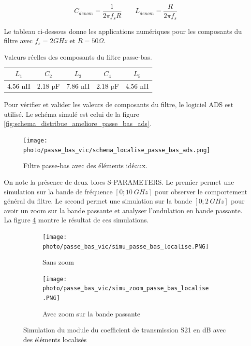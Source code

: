 \documentclass[french]{article}
\begin{document}
\begin{equation}
	C_{denom} = \frac{1}{2\pi f_s R}
	\qquad
	L_{denom} = \frac{R}{2\pi f_s}
\end{equation}

Le tableau ci-dessous donne les applications numériques pour les composants du filtre avec $f_s = 2GHz$ et $R = 50\Omega$.

\begin{table}[H]
	\centering
	\begin{tabular}{|c|c|c|c|c|}
		\hline
		$L_1$ & $C_2$ & $L_3$ & $C_4$ & $L_5$\\
		\hline
		4.56 nH & 2.18 pF & 7.86 nH & 2.18 pF & 4.56 nH\\
		\hline
	\end{tabular}
	\caption{Valeurs réelles des composants du filtre passe-bas.}
	\label{tab:valeurs_composant_passe_bas}
\end{table}

Pour vérifier et valider les valeurs de composants du filtre, le logiciel ADS est utilisé. Le schéma simulé est celui de la figure \ref{fig:schema_distribue_ameliore_passe_bas_ads}. 

\begin{figure}[H]
	\centering
	\texttt{[image: photo/passe\_bas\_vic/schema\_localise\_passe\_bas\_ads.png]}
	\caption{Filtre passe-bas avec des éléments idéaux.}
	\label{fig:schema_localise_passe_bas_ads}
\end{figure}

On note la présence de deux blocs S-PARAMETERS. Le premier permet une simulation sur la bande de fréquence $[0; 10\ GHz]$ pour observer le comportement général du filtre. Le second permet une simulation sur la bande $[0; 2\ GHz]$ pour avoir un zoom sur la bande passante et analyser l'ondulation en bande passante. La figure \ref{fig:simu_passe_bas_localise_global} montre le résultat de ces simulations.

\begin{figure}[H]
	\centering
	\begin{subfigure}[b]{0.49\textwidth}
		\texttt{[image: photo/passe\_bas\_vic/simu\_passe\_bas\_localise.PNG]}
		\caption{Sans zoom}
		\label{fig:simu_passe_bas_localise}
	\end{subfigure}
	\begin{subfigure}[b]{0.49\textwidth}
		\texttt{[image: photo/passe\_bas\_vic/simu\_zoom\_passe\_bas\_localise.PNG]}
		\caption{Avec zoom sur la bande passante}
		\label{fig:simu_zoom_passe_bas_localise}
	\end{subfigure}
	\caption{Simulation du module du coefficient de transmission S21 en dB avec des éléments localisés}
	\label{fig:simu_passe_bas_localise_global}
\end{figure}
\end{document}
